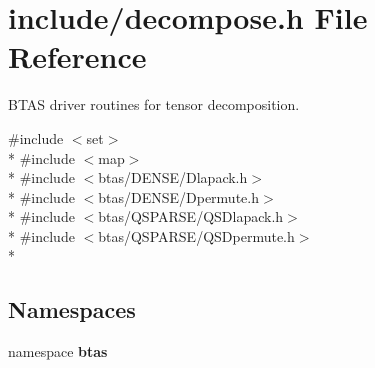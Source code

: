 \section{include/decompose.h File Reference}
\label{df/dfc/decompose_8h}


B\-T\-A\-S driver routines for tensor decomposition.  


{\ttfamily \#include $<$set$>$}\\*
{\ttfamily \#include $<$map$>$}\\*
{\ttfamily \#include $<$btas/\-D\-E\-N\-S\-E/\-Dlapack.\-h$>$}\\*
{\ttfamily \#include $<$btas/\-D\-E\-N\-S\-E/\-Dpermute.\-h$>$}\\*
{\ttfamily \#include $<$btas/\-Q\-S\-P\-A\-R\-S\-E/\-Q\-S\-Dlapack.\-h$>$}\\*
{\ttfamily \#include $<$btas/\-Q\-S\-P\-A\-R\-S\-E/\-Q\-S\-Dpermute.\-h$>$}\\*
\subsection*{Namespaces}
\begin{DoxyCompactItemize}
\item 
namespace {\bf btas}
\end{DoxyCompactItemize}
